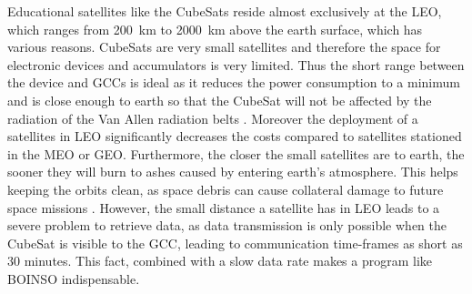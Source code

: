 Educational satellites like the CubeSats reside almost exclusively at the \acf{LEO}, which ranges from 200~km to 2000~km above the earth surface, which has various reasons.
\newline
CubeSats are very small satellites and therefore the space for electronic devices and accumulators is very limited. Thus the short range between the device and \acp{GCC} is ideal as it reduces the power consumption to a minimum and is close enough to earth so that the CubeSat will not be affected by the radiation of the Van Allen radiation belts \cite{horne_wave_2005}.
\newline
Moreover the deployment of a satellites in \ac{LEO} significantly decreases the costs compared to satellites stationed in the \ac{MEO} or \ac{GEO}. 
\newline
Furthermore, the closer the small satellites are to earth, the sooner they will burn to ashes caused by entering earth's atmosphere. This helps keeping the orbits clean, as space debris can cause collateral damage to future space missions \cite{akahoshi_influence_2008}.
\newline
However, the small distance a satellite has in \ac{LEO} leads to a severe problem to retrieve data, as data transmission is only possible when the CubeSat is visible to the \ac{GCC}, leading to communication time-frames as short as 30 minutes. This fact, combined with a slow data rate makes a program like \ac{BOINSO} indispensable. 
\newline
